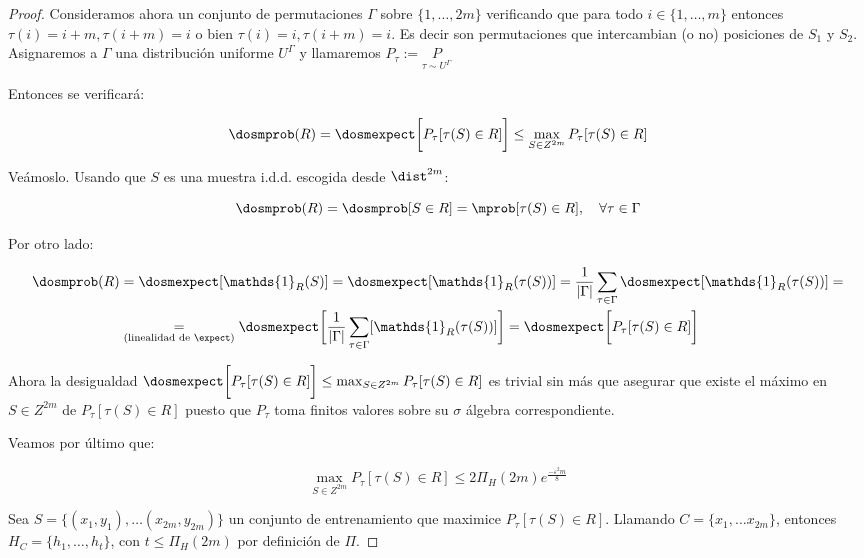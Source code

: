 \begin{proof}
 Consideramos ahora un conjunto de permutaciones $\Gamma$ sobre $\{1, \ldots, 2m\}$ verificando que para todo $i\in \{1,\ldots, m\}$
 entonces $\tau(i) = i+m, \tau(i+m) = i$ o bien $\tau(i) = i, \tau(i+m) = i$. Es decir son permutaciones que intercambian
 (o no) posiciones de $S_1$ y $S_2$. Asignaremos a $\Gamma$ una distribución uniforme $U^{\Gamma}$ y llamaremos 
 $P_{\tau} := \underset{\tau \sim U^{\Gamma}}{P}$
 
 Entonces se verificará:
 
 \begin{equation}
  \dosmprob(R) = \dosmexpect \bigg[P_{\tau} [\tau(S) \in R] \bigg] \le \max_{S\in Z^{2m}} P_{\tau}[\tau(S) \in R]  
  \label{eqn:Rbound}
 \end{equation}

  Veámoslo. Usando que $S$ es una muestra i.d.d. escogida desde $\dist^{2m}$:
  
  \[\dosmprob(R) = \dosmprob[S \in R] = \mprob[\tau(S) \in R], \quad \forall \tau \in \Gamma\]
  
  Por otro lado:
  
  \begin{align*}
  \dosmprob(R) &= \dosmexpect [\mathds{1}_R(S)] = \dosmexpect [\mathds{1}_R(\tau(S))]
    = \frac{1}{|\Gamma|} \sum_{\tau \in \Gamma} \dosmexpect [\mathds{1}_R(\tau(S))] = \\
    &\underset{\textrm{(linealidad de $\expect$)}}{=} \dosmexpect \bigg[ \frac{1}{|\Gamma|} 
    \sum_{\tau \in \Gamma} [\mathds{1}_R(\tau(S))]\bigg] = \dosmexpect \bigg[P_{\tau} [\tau(S) \in R] \bigg]
  \end{align*}

  Ahora la desigualdad $\dosmexpect \bigg[P_{\tau} [\tau(S) \in R] \bigg] \le \max_{S\in Z^{2m}} P_{\tau}[\tau(S) \in R]$
  es trivial sin más que asegurar que existe el máximo en $S\in Z^{2m}$ de $P_{\tau}[\tau(S) \in R]$ puesto que $P_{\tau}$
  toma finitos valores sobre su $\sigma$ álgebra correspondiente.
 
 Veamos por último que:
 
 \begin{equation}
  \max_{S\in Z^{2m}} P_{\tau}[\tau(S) \in R] \le 2\Pi_H(2m) e^{\frac{-\varepsilon^2 m}{8}}
  \label{eqn:permbound}
 \end{equation}

 
  Sea $S = \{(x_1, y_1), \ldots (x_{2m}, y_{2m})\}$ un conjunto de entrenamiento que maximice $P_{\tau}[\tau(S) \in R]$. 
  Llamando $C=\{x_1, \ldots x_{2m}\}$, entonces $H_C = \{h_1, \ldots, h_t\}$, con $t\le \Pi_H(2m)$ por definición de $\Pi$.


\end{proof}
